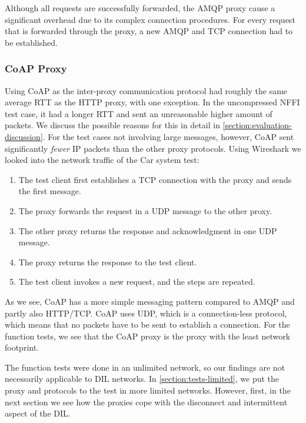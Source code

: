 Although all requests are successfully forwarded, the AMQP proxy cause a
significant overhead due to its complex connection procedures. For every request
that is forwarded through the proxy, a new AMQP and TCP connection had to be
established.

\subsubsection{CoAP Proxy}

Using CoAP as the inter-proxy communication protocol had roughly the same
average RTT as the HTTP proxy, with one exception. In the uncompressed NFFI test
case, it had a longer RTT and sent an unreasonable higher amount of packets. We
discuss the possible reasons for this in detail in
\cref{section:evaluation-discussion}. For the test cases not involving large
messages, however, CoAP sent significantly \textit{fewer} IP packets than the
other proxy protocols. Using Wireshark we looked into the network traffic of the
Car system test:

\begin{enumerate}

    \item The test client first establishes a TCP connection with the proxy and sends
    the first message.

    \item The proxy forwards the request in a UDP message to the other proxy.

    \item The other proxy returns the response and acknowledgment in one UDP
    message.

    \item The proxy returns the response to the test client.

    \item The test client invokes a new request, and the steps are repeated.


\end{enumerate}

As we see, CoAP has a more simple messaging pattern compared to AMQP and partly
also HTTP/TCP. CoAP uses UDP, which is a connection-less protocol, which means
that no packets have to be sent to establish a connection. For the
function tests, we see that the CoAP proxy is the proxy with the least network
footprint.

The function tests were done in an unlimited network, so our findings are not
necessarily applicable to DIL networks. In \cref{section:tests-limited}, we put
the proxy and protocols to the test in more limited networks. However, first, in
the next section we see how the proxies cope with the disconnect and
intermittent aspect of the DIL.


